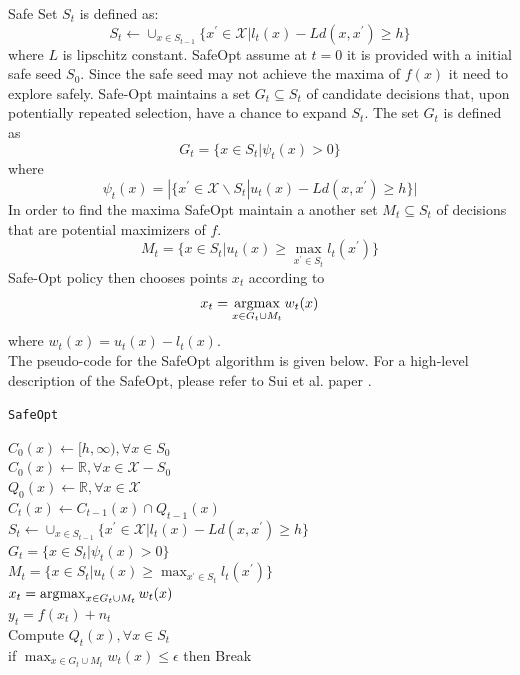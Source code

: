 Safe Set $S_t$ is defined as:
$$ S_t \gets \cup_{x\in S_{t-1}}\{ x^\prime \in \mathcal{X} | l_t(x) - Ld(x,x^\prime) \geq h \} $$
where $L$ is lipschitz constant. 
SafeOpt assume at $t = 0$ it is provided with a initial safe seed $S_0$. 
Since the safe seed may not achieve the maxima of $f(x)$ it need to explore safely.
Safe-Opt maintains a set $G_t \subseteq S_t$ of candidate decisions that, upon potentially repeated selection, have a chance to expand $S_t$. The set $G_t$ is defined as
$$ G_t = \{x \in S_t | \psi_t(x) > 0 \} $$
where
$$ \psi_t(x) = |\{ x^\prime \in \mathcal{X} \backslash S_t | u_t(x) - Ld(x,x^\prime) \geq h \}| $$
In order to find the maxima SafeOpt maintain a another set $M_t \subseteq S_t$ of decisions that are potential maximizers of $f$.
$$ M_t = \{ x \in S_t |u_t(x) \geq \max_{x^\prime \in S_t} l_t(x^\prime) \} $$
Safe-Opt policy then chooses points $x_t$ according to $$ x_t = \operatorname*{argmax}_{x\in G_t \cup M_t}w_t(x) $$
where $w_t(x)=u_t(x)-l_t(x)$.\\
The pseudo-code for the SafeOpt algorithm is given below. For a high-level description of the SafeOpt, please refer to Sui et al. paper \cite{sui15}.\\

\begin{algorithm}[H]
	\caption{\texttt{SafeOpt}}
	\label{alg:safeopt}
	$C_0(x) \gets [h, \infty), \forall x \in S_0$\\
	$C_0(x) \gets \mathbb{R}, \forall x \in \mathcal{X} - S_0$\\
	$Q_0(x) \gets \mathbb{R}, \forall x \in \mathcal{X}$\\
	{
		$C_t(x) \gets C_{t-1}(x) \cap Q_{t-1}(x)$\\
		$S_t \gets \cup_{x\in S_{t-1}}\{ x^\prime \in \mathcal{X} | l_t(x) - Ld(x,x^\prime) \geq h \}$\\
		$G_t = \{x \in S_t | \psi_t(x) > 0 \}$\\
		$M_t = \{ x \in S_t |u_t(x) \geq \max_{x^\prime \in S_t} l_t(x^\prime) \}$\\
		$x_t = \operatorname*{argmax}_{x\in G_t \cup M_t}w_t(x)$\\
		$y_t = f(x_t)+n_t$\\
		Compute $Q_t(x), \forall x \in S_t$\\
		if $\max_{ x\in G_t \cup M_t}w_t(x) \leq \epsilon$ then Break
	}
\end{algorithm}

